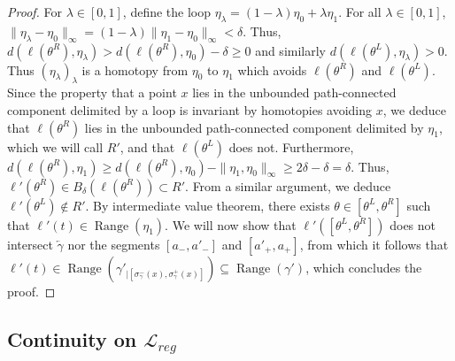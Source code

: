 \documentclass[11pt]{article}
\DeclareMathOperator{\Range}{Range}
\def\rhos{\mathbf{r}}
\begin{document}
\begin{proof}
  For $\lambda\in [0,1]$, define the loop
  $\eta_\lambda=(1-\lambda) \eta_0+\lambda \eta_1$. For all $\lambda\in [0,1]$, $\|\eta_\lambda- \eta_0\|_\infty=(1-\lambda)   \|\eta_1-\eta_0\|_\infty<\delta$.
  Thus, $d(\ell(\theta^R),\eta_\lambda)> d(\ell(\theta^R), \eta_0) -\delta\geq 0$  and similarly $d(\ell(\theta^L),\eta_\lambda)>0$. Thus $(\eta_\lambda)_\lambda$ is a homotopy from $\eta_0$ to $\eta_1$ which avoids $\ell(\theta^R)$ and $\ell(\theta^L)$. Since
  the property that a point $x$ lies in the unbounded path-connected component delimited by a loop is invariant by homotopies avoiding $x$, we deduce that  $\ell(\theta^R)$ lies in the unbounded path-connected component delimited by $\eta_1$, which we will call $R'$, and that
  $\ell(\theta^L)$ does not.
  Furthermore, $d(\ell(\theta^R),\eta_1)\geq d(\ell(\theta^R),\eta_0)-\|\eta_1,\eta_0\|_\infty\geq 2\delta-\delta=\delta$. Thus, $\ell'(\theta^R ) \in B_\delta( \ell(\theta^R)) \subset R'$.
  From a similar argument, we deduce $
  \ell'(\theta^L)  \notin R'$.
  By intermediate value theorem, there exists $\theta\in [\theta^L,\theta^R]$ such that $\ell'(t)\in \Range(\eta_1)$. We will now show that $\ell'([\theta^L,\theta^R] )$ does not intersect $\overleftarrow{\gamma}$ nor the segments $[a_-,a'_-]$ and $[a'_+,a_+]$, from which it follows that
	$\ell'(t)\in \Range(\gamma'_{|[\sigma_\gamma^-(x), \sigma_\gamma^+(x)]})\subseteq \Range(\gamma')$, which concludes the proof.
\end{proof}

\subsection{Continuity on \texorpdfstring{$\mathscr{L}_{reg}$}{Lreg} }


\label{SS:33}
\end{document}
